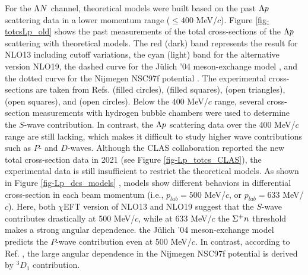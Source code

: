 For the $\Lambda N$ channel, theoretical models were built based on the past $\Lambda p$ scattering data in a lower momentum range ($\leq400$ MeV/$c$). Figure \ref{fig-totcsLp_old} \cite{chiEFT-2020} shows the past measurements of the total cross-sections of the $\Lambda p$ scattering with theoretical models. The red (dark) band represents the result for NLO13 \cite{NLO13} including cutoff variations, the cyan (light) band for the alternative version NLO19, the dashed curve for the J\"{u}lich '04 meson-exchange model \cite{chiEFT-2005}, and the dotted curve for the Nijmegen NSC97f potential \cite{NSC97f}. The experimental cross-sections are taken from Refs. \cite{Lp-1968_Sechi} (filled circles), \cite{Lp-1968_Alex} (filled squares), \cite{Lp-1967_Herndon} (open triangles), \cite{Lp-1971} (open squares), and \cite{Lp-1977_Hauptman} (open circles). Below the $400$ MeV/$c$ range, several cross-section measurements with hydrogen bubble chambers were used to determine the $S$-wave contribution. In contrast, the $\Lambda p$ scattering data over the $400$ MeV/$c$ range are still lacking, which makes it difficult to study higher wave contributions such as $P$- and $D$-waves. Although the CLAS collaboration reported the new total cross-section data in 2021 \cite{Lp-2021} (see Figure \ref{fig-Lp_totcs_CLAS}), the experimental data is still insufficient to restrict the theoretical models. As shown in Figure \ref{fig-Lp_dcs_models} \cite{chiEFT-2020}, models show different behaviors in differential cross-section in each beam momentum (i.e., $p_{lab}=500$ MeV/$c$, or $p_{lab}=633$ MeV/$c$). Here, both $\chi$EFT version of NLO13 and NLO19 suggest that the $S$-wave contributes drastically at 500 MeV/$c$, while at 633 MeV/$c$ the $\Sigma^{+}n$ threshold makes a strong angular dependence. the J\"{u}lich '04 meson-exchange model predicts the $P$-wave contribution even at 500 MeV/$c$. In contrast, according to Ref. \cite{OBE-1999}, the large angular dependence in the Nijmegen NSC97f potential is derived by $^3D_1$ contribution. 




